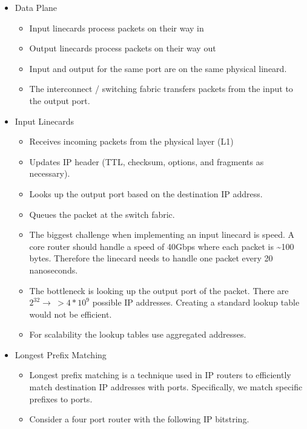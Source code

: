 \documentclass[]{article}
\providecommand{\tightlist}{%
  \setlength{\itemsep}{0pt}\setlength{\parskip}{0pt}}
\begin{document}
\begin{itemize}
\tightlist
\item
  Data Plane

  \begin{itemize}
  \tightlist
  \item
    Input linecards process packets on their way in
  \item
    Output linecards process packets on their way out
  \item
    Input and output for the same port are on the same physical lineard.
  \item
    The interconnect / switching fabric transfers packets from the input
    to the output port.
  \end{itemize}
\item
  Input Linecards

  \begin{itemize}
  \tightlist
  \item
    Receives incoming packets from the physical layer (L1)
  \item
    Updates IP header (TTL, checksum, options, and fragments as
    necessary).
  \item
    Looks up the output port based on the destination IP address.
  \item
    Queues the packet at the switch fabric.
  \item
    The biggest challenge when implementing an input linecard is speed.
    A core router should handle a speed of 40Gbps where each packet is
    \textasciitilde{}100 bytes. Therefore the linecard needs to handle
    one packet every 20 nanoseconds.
  \item
    The bottleneck is looking up the output port of the packet. There
    are \(2^32 \to \ > 4 * 10^9\) possible IP addresses. Creating a
    standard lookup table would not be efficient.
  \item
    For scalability the lookup tables use aggregated addresses.
  \end{itemize}
\item
  Longest Prefix Matching

  \begin{itemize}
  \tightlist
  \item
    Longest prefix matching is a technique used in IP routers to
    efficiently match destination IP addresses with ports. Specifically,
    we match specific prefixes to ports.
  \item
    Consider a four port router with the following IP bitstring.
  \end{itemize}


\end{itemize}
\end{document}
